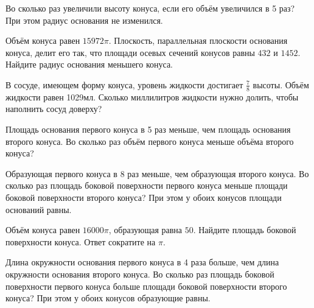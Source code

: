 \documentclass[a4paper]{article}
\begin{document}
\begin{taskBN}{92}
Во сколько раз увеличили высоту конуса, если его объём увеличился в 5 раз? При этом радиус основания не изменился.
\end{taskBN}

\begin{taskBN}{93}
Объём конуса равен $15972\pi$. Плоскость, параллельная плоскости основания конуса,  делит его так, что площади осевых сечений конусов равны $432$ и $1452$. Найдите радиус основания меньшего конуса. 
\end{taskBN}

\begin{taskBN}{94}
В сосуде, имеющем форму конуса, уровень жидкости достигает $\frac{7}{8}$ высоты. Объём жидкости равен 1029мл. Сколько миллилитров жидкости нужно долить, чтобы наполнить сосуд доверху?
\end{taskBN}

\begin{taskBN}{95}
Площадь основания первого конуса в 5 раз меньше, чем площадь основания второго конуса. Во сколько раз объём первого конуса меньше объёма второго конуса?
\end{taskBN}

\begin{taskBN}{96}
Образующая первого конуса в 8 раз меньше, чем образующая второго конуса. Во сколько раз площадь боковой поверхности первого конуса меньше площади боковой поверхности второго конуса? При этом у обоих конусов площади оснований равны.
\end{taskBN}

\begin{taskBN}{97}
Объём конуса равен $16000\pi$, образующая равна $50$. Найдите площадь боковой поверхности конуса. Ответ сократите на $\pi$.
\end{taskBN}

\begin{taskBN}{98}
Длина окружности основания первого конуса в 4 раза больше, чем длина окружности основания второго конуса. Во сколько раз площадь боковой поверхности первого конуса больше площади боковой поверхности второго конуса? При этом у обоих конусов образующие равны.
\end{taskBN}
\end{document}
